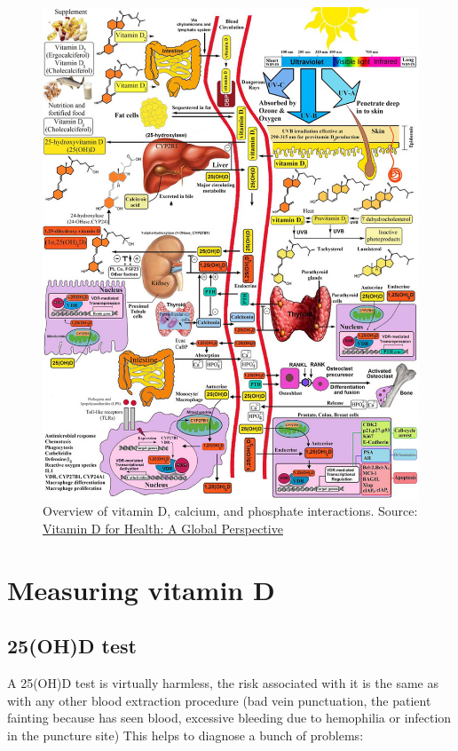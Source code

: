 \begin{figure}[h!]

    \centering
    \includegraphics[width=1\textwidth]{figures/Vitamin D/nihms502359f1.jpg}
    \caption{Overview of vitamin D, calcium, and phosphate interactions. Source: \href{https://www.ncbi.nlm.nih.gov/pmc/articles/PMC3761874/}{Vitamin D for Health: A Global Perspective}}
    \label{fig:vitDPathways}

\end{figure}

\section{Measuring vitamin D}

\subsection{25(OH)D test}

A 25(OH)D test is virtually harmless, the risk associated with it is the same as with any other blood extraction procedure (bad vein punctuation, the patient fainting because has seen blood, excessive bleeding due to hemophilia or infection in the puncture site) This helps to diagnose a bunch of problems:

